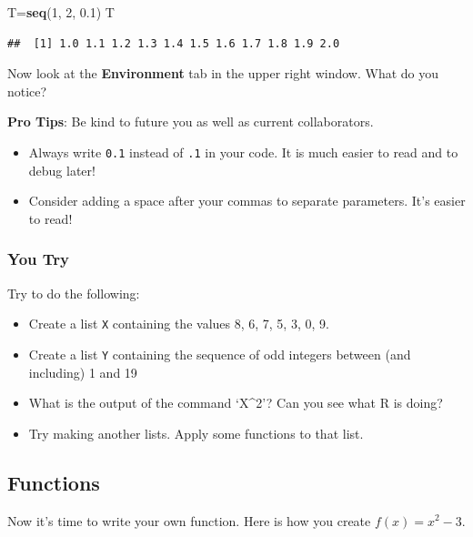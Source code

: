 \documentclass[
]{book}
\newenvironment{Shaded}{\begin{snugshade}}{\end{snugshade}}
\newcommand{\DecValTok}[1]{\textcolor[rgb]{0.00,0.00,0.81}{#1}}
\newcommand{\FloatTok}[1]{\textcolor[rgb]{0.00,0.00,0.81}{#1}}
\newcommand{\KeywordTok}[1]{\textcolor[rgb]{0.13,0.29,0.53}{\textbf{#1}}}
\newcommand{\NormalTok}[1]{#1}
\providecommand{\tightlist}{%
  \setlength{\itemsep}{0pt}\setlength{\parskip}{0pt}}
\begin{document}
\begin{Shaded}
\begin{Highlighting}[]
\NormalTok{T=}\KeywordTok{seq}\NormalTok{(}\DecValTok{1}\NormalTok{, }\DecValTok{2}\NormalTok{, }\FloatTok{0.1}\NormalTok{)}
\NormalTok{T}
\end{Highlighting}
\end{Shaded}

\begin{verbatim}
##  [1] 1.0 1.1 1.2 1.3 1.4 1.5 1.6 1.7 1.8 1.9 2.0
\end{verbatim}

Now look at the \textbf{Environment} tab in the upper right window. What do you notice?

\textbf{Pro Tips}: Be kind to future you as well as current collaborators.

\begin{itemize}
\tightlist
\item
  Always write \texttt{0.1} instead of \texttt{.1} in your code. It is much easier to read and to debug later!
\item
  Consider adding a space after your commas to separate parameters. It's easier to read!
\end{itemize}

\hypertarget{you-try-1}{%
\subsubsection{You Try}\label{you-try-1}}

Try to do the following:

\begin{itemize}
\tightlist
\item
  Create a list \texttt{X} containing the values 8, 6, 7, 5, 3, 0, 9.
\item
  Create a list \texttt{Y} containing the sequence of odd integers between (and including) 1 and 19
\item
  What is the output of the command `X\^{}2'? Can you see what R is doing?
\item
  Try making another lists. Apply some functions to that list.
\end{itemize}

\hypertarget{functions}{%
\subsection{Functions}\label{functions}}

Now it's time to write your own function. Here is how you create \(f(x)= x^2 -3\).
\end{document}
